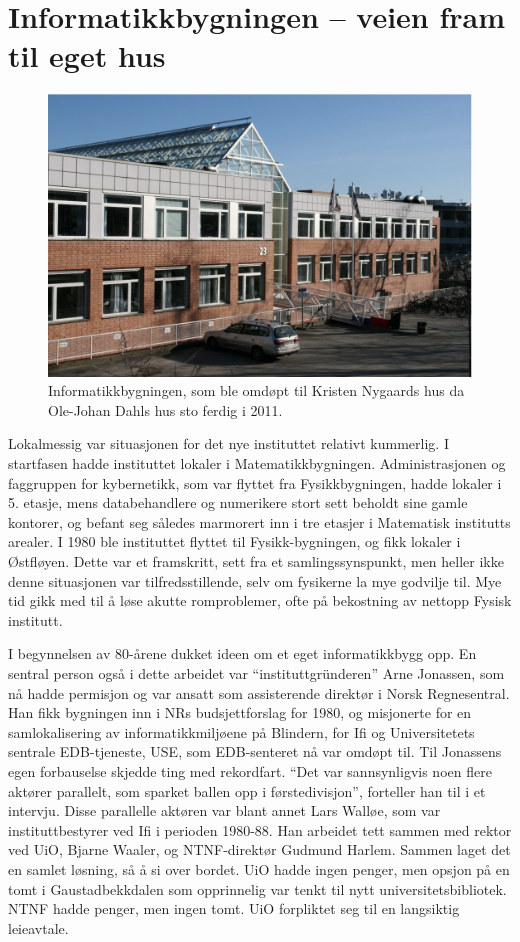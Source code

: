 \documentclass[../../main.tex]{subfiles}
\begin{document}
\chapter[Ifi 1]{Informatikkbygningen – veien fram til eget hus}

\begin{figure}
	\includegraphics[width=\linewidth]{images/ifi1.png}
	\caption{Informatikkbygningen, som ble omdøpt til Kristen Nygaards hus da Ole-Johan Dahls hus sto ferdig i 2011.}
\end{figure}

Lokalmessig var situasjonen for det nye instituttet relativt kummerlig. I startfasen hadde instituttet lokaler i Matematikkbygningen. Administrasjonen og faggruppen for kybernetikk, som var flyttet fra Fysikkbygningen, hadde lokaler i 5. etasje, mens databehandlere og numerikere stort sett beholdt sine gamle kontorer, og befant seg således marmorert inn i tre etasjer i Matematisk institutts arealer. I 1980 ble instituttet flyttet til Fysikk-bygningen, og fikk lokaler i Østfløyen. Dette var et framskritt, sett fra et samlingssynspunkt, men heller ikke denne situasjonen var tilfredsstillende, selv om fysikerne la mye godvilje til. Mye tid gikk med til å løse akutte romproblemer, ofte på bekostning av nettopp Fysisk institutt.

I begynnelsen av 80-årene dukket ideen om et eget informatikkbygg opp. En sentral person også i dette arbeidet var ``instituttgründeren'' Arne Jonassen, som nå hadde permisjon og var ansatt som assisterende direktør i Norsk Regnesentral. Han fikk bygningen inn i NRs budsjettforslag for 1980, og misjonerte for en samlokalisering av informatikkmiljøene på Blindern, for Ifi og Universitetets sentrale EDB-tjeneste, USE, som EDB-senteret nå var omdøpt til. Til Jonassens egen forbauselse skjedde ting med rekordfart. ``Det var sannsynligvis noen flere aktører parallelt, som sparket ballen opp i førstedivisjon'', forteller han til i et intervju. Disse parallelle aktøren var blant annet Lars Walløe, som var instituttbestyrer ved Ifi i perioden 1980-88. Han arbeidet tett sammen med rektor ved UiO, Bjarne Waaler, og NTNF-direktør Gudmund Harlem. Sammen laget det en samlet løsning, så å si over bordet. UiO hadde ingen penger, men opsjon på en tomt i Gaustadbekkdalen som opprinnelig var tenkt til nytt universitetsbibliotek. NTNF hadde penger, men ingen tomt. UiO forpliktet seg til en langsiktig leieavtale. 
\end{document}
